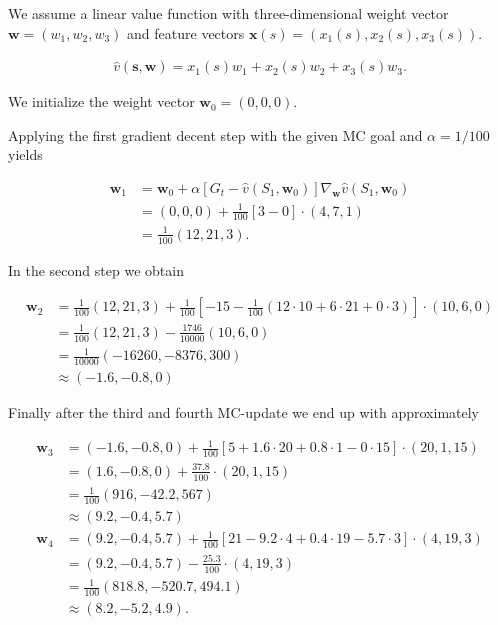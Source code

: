 \begin{solution}

We assume a linear value function with three-dimensional weight vector $\textbf{w} = (w_1,w_2,w_3)$
and feature vectors $\textbf{x}(s) = (x_1(s), x_2(s), x_3(s))$.

\begin{align*}
    \hat{v}(\textbf{s}, \textbf{w}) = x_1(s)w_1 + x_2(s)w_2 + x_3(s)w_3.
\end{align*}

We initialize the weight vector $\textbf{w}_0 = (0,0,0)$.

Applying the first gradient decent step with the given MC goal and $\alpha = 1/100$ yields

\begin{align*}
    \textbf{w}_1 &= \textbf{w}_0 + \alpha 
    \left[G_t - \hat{v}(S_1, \textbf{w}_0)\right]\nabla_{\textbf{w}}\hat{v}(S_1, \textbf{w}_0) \\
    &= (0,0,0) + \frac{1}{100}[3 - 0] \cdot (4,7,1) \\
    &= \frac{1}{100}(12,21,3).
\end{align*}

In the second step we obtain

\begin{align*}
    \textbf{w}_2 &= \frac{1}{100}(12,21,3) + \frac{1}{100}
    \left[-15 - \frac{1}{100}(12 \cdot 10 + 6 \cdot 21 + 0 \cdot 3)\right]
    \cdot (10, 6, 0) \\
    &= \frac{1}{100}(12,21,3) - \frac{1746}{10000}(10, 6, 0) \\
    &= \frac{1}{10000}(-16260,-8376,300) \\
    &\approx (-1.6, -0.8, 0)
\end{align*}

Finally after the third and fourth MC-update we end up with approximately

\begin{align*}
    \textbf{w}_3 &= (-1.6, -0.8, 0) + 
    \frac{1}{100}\left[5 + 1.6\cdot 20 + 0.8 \cdot 1 - 0 \cdot 15\right]
    \cdot (20, 1, 15) \\
    &= (1.6, -0.8, 0) + \frac{37.8}{100}\cdot (20, 1, 15) \\
    &= \frac{1}{100}(916, -42.2, 567) \\
    &\approx (9.2, -0.4, 5.7) \\
    \textbf{w}_4 &= (9.2, -0.4, 5.7) +
    \frac{1}{100}\left[21 - 9.2 \cdot 4 + 0.4 \cdot 19 - 5.7 \cdot 3\right]
    \cdot (4, 19, 3) \\
    &= (9.2, -0.4, 5.7) - \frac{25.3}{100}\cdot (4, 19, 3) \\
    &= \frac{1}{100}(818.8, -520.7, 494.1) \\
    &\approx (8.2, -5.2, 4.9).
\end{align*}

\end{solution}

